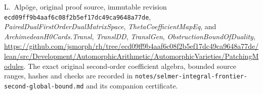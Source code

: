 L.~Alp\"oge, original proof source, immutable revision
\texttt{ecd09ff9b4aaf6c08f2b5ef17dc49ca9648a77de},
\emph{PairedDualFirstOrderDualMatrixSpace},
\emph{ThetaCoefficientMapEq}, and
\emph{ArchimedeanH0Cards.Transl}, \emph{TranslDD},
\emph{TranslGen}, \emph{ObstructionBoundOfDuality},
\url{https://github.com/jsmorph/rh/tree/ecd09ff9b4aaf6c08f2b5ef17dc49ca9648a77de/lean/src/Development/AutomorphicArithmetic/AutomorphicVarieties/PatchingModules}.
The exact original second-order coefficient algebra, bounded
source ranges, hashes and checks are recorded in
\texttt{notes/selmer-integral-frontier-second-global-bound.md}
and its companion certificate.
